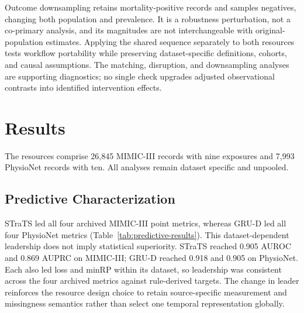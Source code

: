 \documentclass[letterpaper]{article}
\begin{document}
Outcome downsampling retains mortality-positive records and samples negatives,
changing both population and prevalence. It is a robustness perturbation, not a
co-primary analysis, and its magnitudes are not interchangeable with original-
population estimates. Applying the shared sequence separately to both resources
tests workflow portability while preserving dataset-specific definitions,
cohorts, and causal assumptions. The matching, disruption, and downsampling
analyses are supporting diagnostics; no single check upgrades adjusted
observational contrasts into identified intervention effects.

\section{Results}

The resources comprise 26,845 MIMIC-III records with nine exposures and 7,993
PhysioNet records with ten. All analyses remain dataset specific and unpooled.

\subsection{Predictive Characterization}

STraTS led all four archived MIMIC-III point metrics, whereas GRU-D led all four
PhysioNet metrics (Table~\ref{tab:predictive-results}). This dataset-dependent
leadership does not imply statistical superiority. STraTS reached 0.905 AUROC
and 0.869 AUPRC on MIMIC-III; GRU-D reached 0.918 and 0.905 on PhysioNet. Each
also led loss and minRP within its dataset, so leadership was consistent across
the four archived metrics against rule-derived targets. The change in leader
reinforces the resource design choice to retain source-specific measurement and
missingness semantics rather than select one temporal representation globally.
\end{document}
